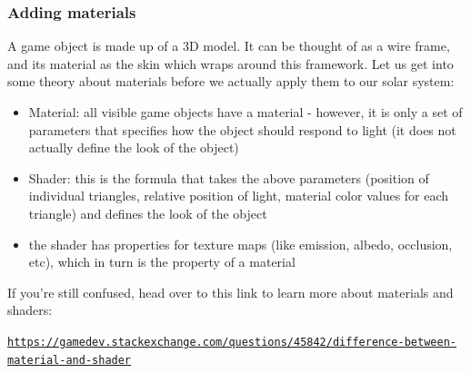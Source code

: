 \documentclass{article}[a4paper,12pt]
\theoremstyle{definition}
\begin{document}
\subsubsection{Adding materials}
A game object is made up of a 3D model. It can be thought of as a wire frame, and its material as the skin which wraps around this framework. Let us get into some theory about materials before we actually apply them to our solar system:
\begin{itemize}
	\item Material: all visible game objects have a material - however, it is only a set of parameters that specifies how the object should respond to light (it does not actually define the look of the object)
	\item Shader: this is the formula that takes the above parameters (position of individual triangles, relative position of light, material color values for each triangle) and defines the look of the object
	\item the shader has properties for texture maps (like emission, albedo, occlusion, etc), which in turn is the property of a material
\end{itemize}
If you're still confused, head over to this link to learn more about materials and shaders: 

\texttt{\href{https://gamedev.stackexchange.com/questions/45842/difference-between-material-and-shader}{https://gamedev.stackexchange.com/questions/45842/difference-between-material-and-shader}}
\vspace{6pt}
\end{document}
